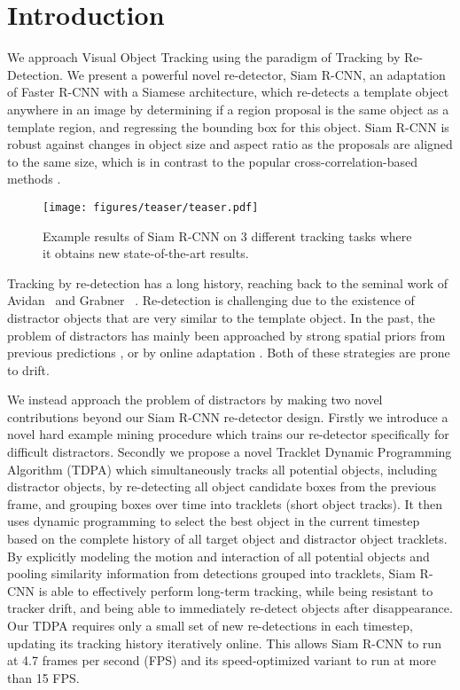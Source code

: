 \documentclass[10pt,twocolumn,letterpaper]{article}
\begin{document}
\vspace{-10pt}
\section{Introduction}

We approach Visual Object Tracking using the paradigm of Tracking by Re-Detection. We present a powerful novel re-detector, Siam R-CNN, an adaptation of Faster R-CNN \cite{Ren15NIPS} with a Siamese architecture, which re-detects a template object anywhere in an image by determining if a region proposal is the same object as a template region, and regressing the bounding box for this object.  Siam R-CNN is robust against changes in object size and aspect ratio as the proposals are aligned to the same size, which is in contrast to the popular cross-correlation-based methods \cite{Li18CVPRSiamRPN}.

\begin{figure}[t!]
\centering
\texttt{[image: figures/teaser/teaser.pdf]}
\caption{Example results of Siam R-CNN on 3 different tracking tasks where it obtains new state-of-the-art results.} \label{fig:teaser}
\end{figure}

Tracking by re-detection has a long history, reaching back to the seminal work of Avidan~\cite{Avidan04PAMI} and Grabner \etal~\cite{Grabner06BMVC}.
Re-detection is challenging due to the existence of distractor objects that are very similar to the template object. In the past, the problem of distractors has mainly been approached by strong spatial priors from previous predictions \cite{Bertinetto2016ECCV,Li18CVPRSiamRPN, Li19CVPR}, or by online adaptation \cite{Avidan04PAMI, Grabner06BMVC, Babenko11PAMI, Saffari10CVPR, Hare15PAMI, Saffari09ICCVW, TLD}. Both of these strategies are prone to drift.

We instead approach the problem of distractors by making two novel contributions beyond our Siam R-CNN re-detector design. Firstly we introduce a novel hard example mining procedure which trains our re-detector specifically for difficult distractors.
Secondly we propose a novel Tracklet Dynamic Programming Algorithm (TDPA) which simultaneously tracks all potential objects, including distractor objects, by re-detecting all object candidate boxes from the previous frame, and grouping boxes over time into tracklets (short object tracks). It then uses dynamic programming to select the best object in the current timestep based on the complete history of all target object and distractor object tracklets. By explicitly modeling the motion and interaction of all potential objects and pooling similarity information from detections grouped into tracklets, Siam R-CNN is able to effectively perform long-term tracking, while being resistant to tracker drift, and being able to immediately re-detect objects after disappearance.
Our TDPA requires only a small set of new re-detections in each timestep, updating its tracking history iteratively online. This allows Siam R-CNN to run at 4.7 frames per second (FPS) and its speed-optimized variant to run at more than 15 FPS.
\end{document}
